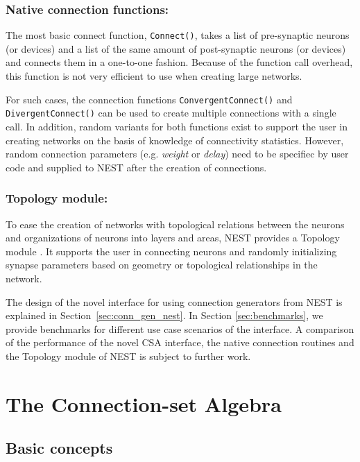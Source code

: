 \documentclass{frontiersSCNS} %
\begin{document}
\subsubsection{Native connection functions:}

The most basic connect function, \verb|Connect()|, takes a list of
pre-synaptic neurons (or devices) and a list of the same amount of
post-synaptic neurons (or devices) and connects them in a one-to-one
fashion. Because of the function call overhead, this function is not
very efficient to use when creating large networks.

For such cases, the connection functions \verb|ConvergentConnect()|
and \verb|DivergentConnect()| can be used to create multiple
connections with a single call. In addition, random variants for both
functions exist to support the user in creating networks on the basis
of knowledge of connectivity statistics. However, random connection
parameters (e.g. \emph{weight} or \emph{delay}) need to be specifiec
by user code and supplied to NEST after the creation of connections.

\subsubsection{Topology module:}

To ease the creation of networks with topological relations between
the neurons and organizations of neurons into layers and areas, NEST
provides a Topology module \citep{Plesser_13}. It supports the user in
connecting neurons and randomly initializing synapse parameters based
on geometry or topological relationships in the network.

The design of the novel interface for using connection generators from
NEST is explained in Section~\ref{sec:conn_gen_nest}. In Section
\ref{sec:benchmarks}, we provide benchmarks for different use case
scenarios of the interface. A comparison of the performance of the
novel CSA interface, the native connection routines and the Topology
module of NEST is subject to further work.


\section{The Connection-set Algebra}\label{sec:csa}

\subsection{Basic concepts}
\end{document}
